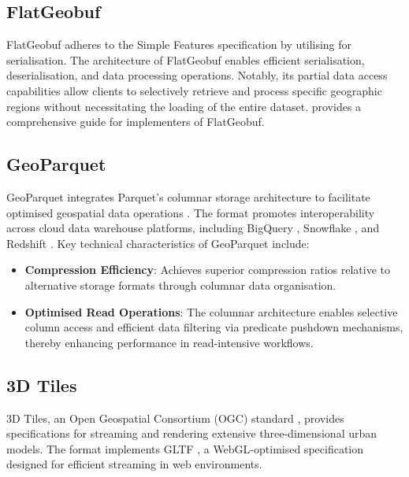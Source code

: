 \subsection{FlatGeobuf}
\label{rw:cloud_optimised_implementations:flatgeobuf}
FlatGeobuf adheres to the Simple Features \citet{simple_features} specification by utilising \citet{flatbuffers} for serialisation. The architecture of FlatGeobuf enables efficient serialisation, deserialisation, and data processing operations. Notably, its partial data access capabilities allow clients to selectively retrieve and process specific geographic regions without necessitating the loading of the entire dataset. \citet{horance_2022_detail} provides a comprehensive guide for implementers of FlatGeobuf.

\subsection{GeoParquet}
\label{rw:cloud_optimised_implementations:geoparquet}
GeoParquet integrates Parquet's columnar storage architecture to facilitate optimised geospatial data operations \citep{geoparquet}. The format promotes interoperability across cloud data warehouse platforms, including BigQuery \citep{bigquery}, Snowflake \citep{snowflake}, and Redshift \citep{redshift}. Key technical characteristics of GeoParquet include:

\begin{itemize}
  \item \textbf{Compression Efficiency}: Achieves superior compression ratios relative to alternative storage formats through columnar data organisation.
  \item \textbf{Optimised Read Operations}: The columnar architecture enables selective column access and efficient data filtering via predicate pushdown mechanisms, thereby enhancing performance in read-intensive workflows.
\end{itemize}

\subsection{3D Tiles}
\label{rw:cloud_optimised_implementations:3d_tiles}
3D Tiles, an Open Geospatial Consortium (OGC) standard \citep{3d_tiles}, provides specifications for streaming and rendering extensive three-dimensional urban models. The format implements GLTF \citep{gltf}, a WebGL-optimised specification designed for efficient streaming in web environments.

